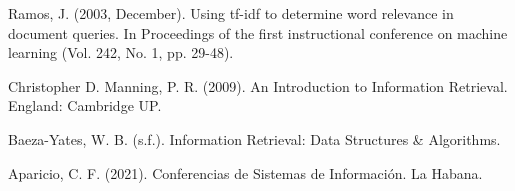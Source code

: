 \documentclass{llncs}
\begin{document}
\tableofcontents
\clearpage














%
%
\begin{thebibliography}{}
%

Ramos, J. (2003, December). Using tf-idf to determine word relevance in
document queries. In Proceedings of the first instructional conference on
machine learning (Vol. 242, No. 1, pp. 29-48).

\bibitem{}
Christopher D. Manning, P. R. (2009). An Introduction to Information Retrieval.
England: Cambridge UP.

\bibitem{}
Baeza-Yates, W. B. (s.f.). Information Retrieval: Data Structures \&
Algorithms.

\bibitem{}
Aparicio, C. F. (2021). Conferencias de Sistemas de Información. La Habana.


\end{thebibliography}
\clearpage
{} %
\renewcommand{\indexname}{Subject Index}

\end{document}
